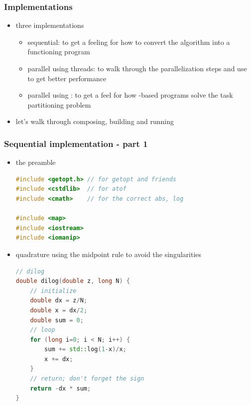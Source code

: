 %
\begin{frame}[fragile]
%
  \frametitle{Implementations}
%
  \begin{itemize}
%
    \item three implementations
      \begin{itemize}
      \item sequential: to get a feeling for how to convert the algorithm into a functioning
        program
      \item parallel using threads: to walk through the parallelization steps and use
         to get better performance
      \item parallel using \mpi: to get a feel for how \mpi-based programs solve the task
        partitioning problem
      \end{itemize}
%
    \item let's walk through composing, building and running
%
  \end{itemize}
%
\end{frame}

\begin{frame}[fragile]
%
  \frametitle{Sequential implementation - part 1}
%
  \begin{itemize}
  \item the preamble
  \begin{lstlisting}[language=c++,name=sequential]
#include <getopt.h> // for getopt and friends
#include <cstdlib>  // for atof
#include <cmath>    // for the correct abs, log

#include <map>
#include <iostream>
#include <iomanip>
  \end{lstlisting}
%
  \item quadrature using the midpoint rule to avoid the singularities
  \begin{lstlisting}[language=c++,name=sequential]
// dilog
double dilog(double z, long N) {
    // initialize
    double dx = z/N;
    double x = dx/2;
    double sum = 0;
    // loop
    for (long i=0; i < N; i++) {
        sum += std::log(1-x)/x;
        x += dx;
    }
    // return; don't forget the sign
    return -dx * sum;
}

  \end{lstlisting}
%
  \end{itemize}
%
\end{frame}

